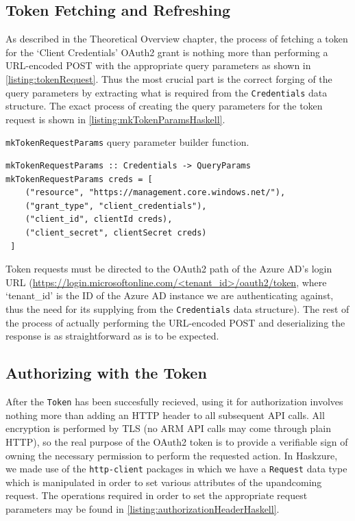 \documentclass[11pt]{report}
\begin{document}
\subsection{Token Fetching and Refreshing}

As described in the Theoretical Overview chapter, the process of fetching a
token for the `Client Credentials' OAuth2 grant is nothing more than performing
a URL-encoded POST with the appropriate query parameters as shown in
\autoref{listing:tokenRequest}. Thus the most crucial part is the correct
forging of the query parameters by extracting what is required from the
\texttt{Credentials} data structure. The exact process of creating the query
parameters for the token request is shown in
\autoref{listing:mkTokenParamsHaskell}.

\begin{listing}[H]
\caption{\texttt{mkTokenRequestParams} query parameter builder function.}
\label{listing:mkTokenParamsHaskell}
\begin{verbatim}
mkTokenRequestParams :: Credentials -> QueryParams
mkTokenRequestParams creds = [
    ("resource", "https://management.core.windows.net/"),
    ("grant_type", "client_credentials"),
    ("client_id", clientId creds),
    ("client_secret", clientSecret creds)
 ]
\end{verbatim}
\end{listing}

Token requests must be directed to the OAuth2 path of the Azure AD's login URL
(\url{https://login.microsoftonline.com/<tenant_id>/oauth2/token}, where
`tenant\_id' is the ID of the Azure AD instance we are authenticating against,
thus the need for its supplying from the \texttt{Credentials} data structure).
The rest of the process of actually performing the URL-encoded POST and
deserializing the response is as straightforward as is to be expected.

\subsection{Authorizing with the Token}

After the \texttt{Token} has been succesfully recieved, using it for
authorization involves nothing more than adding an HTTP header to all
subsequent API calls. All encryption is performed by TLS (no ARM API calls
may come through plain HTTP), so the real purpose of the OAuth2 token is to
provide a verifiable sign of owning the necessary permission to perform the
requested action. \newline
In Haskzure, we made use of the \texttt{http-client}\cite{packageHTTPClient}
packages in which we have a \texttt{Request} data type which is
manipulated in order to set various attributes of the upandcoming request.
The operations required in order to set the appropriate request parameters
may be found in \autoref{listing:authorizationHeaderHaskell}.
\end{document}
